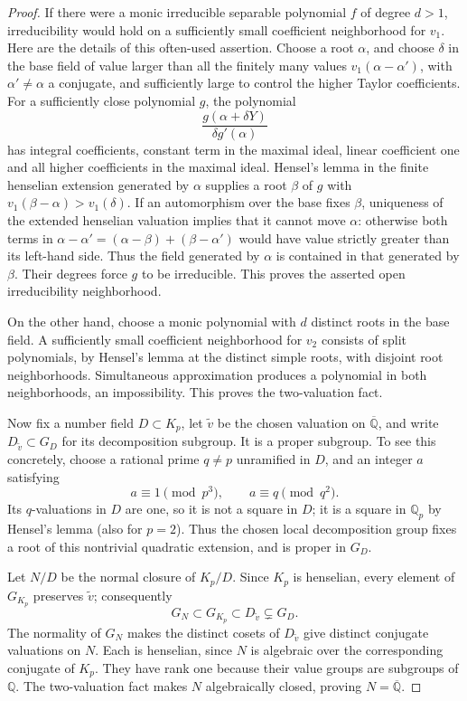 \begin{proof}
If there were a monic irreducible separable polynomial
\(f\) of degree \(d>1\), irreducibility would hold on
a sufficiently small coefficient neighborhood for \(v_1\).
Here are the details of this often-used assertion. Choose
a root \(\alpha\), and choose \(\delta\) in the base
field of value larger than all the finitely many values
\(v_1(\alpha-\alpha')\), with \(\alpha'\ne\alpha\)
a conjugate, and sufficiently large to control the higher
Taylor coefficients. For a sufficiently close polynomial
\(g\), the polynomial
\[
 \frac{g(\alpha+\delta Y)}{\delta g'(\alpha)}
\]
has integral coefficients, constant term in the maximal
ideal, linear coefficient one and all higher coefficients
in the maximal ideal. Hensel's lemma in the finite
henselian extension generated by \(\alpha\) supplies
a root \(\beta\) of \(g\) with
\(v_1(\beta-\alpha)>v_1(\delta)\).
If an automorphism over the base fixes \(\beta\),
uniqueness of the extended henselian valuation implies
that it cannot move \(\alpha\): otherwise both terms
in \(\alpha-\alpha'=(\alpha-\beta)+(\beta-\alpha')\)
would have value strictly greater than its left-hand side.
Thus the field generated by \(\alpha\) is contained
in that generated by \(\beta\). Their degrees force
\(g\) to be irreducible. This proves the asserted open
irreducibility neighborhood.

On the other hand, choose a monic polynomial with \(d\)
distinct roots in the base field. A sufficiently small
coefficient neighborhood for \(v_2\) consists of split
polynomials, by Hensel's lemma at the distinct simple
roots, with disjoint root neighborhoods. Simultaneous
approximation produces a polynomial in both neighborhoods,
an impossibility. This proves the two-valuation fact.

Now fix a number field \(D\subset K_p\), let
\(\widetilde v\) be the chosen valuation on
\(\overline{\mathbb Q}\), and write
\(D_{\widetilde v}\subset G_D\) for its decomposition
subgroup. It is a proper subgroup. To see this concretely,
choose a rational prime \(q\ne p\) unramified in
\(D\), and an integer \(a\) satisfying
\[
 a\equiv1\pmod{p^3},\qquad a\equiv q\pmod{q^2}.
\]
Its \(q\)-valuations in \(D\) are one, so it is not
a square in \(D\); it is a square in \(\mathbb Q_p\)
by Hensel's lemma (also for \(p=2\)). Thus the chosen
local decomposition group fixes a root of this nontrivial
quadratic extension, and is proper in \(G_D\).

Let \(N/D\) be the normal closure of \(K_p/D\).
Since \(K_p\) is henselian, every element of \(G_{K_p}\)
preserves \(\widetilde v\); consequently
\[
 G_N\subset G_{K_p}\subset D_{\widetilde v}
                       \subsetneq G_D.
\]
The normality of \(G_N\) makes the distinct cosets of
\(D_{\widetilde v}\) give distinct conjugate valuations
on \(N\). Each is henselian, since \(N\) is algebraic
over the corresponding conjugate of \(K_p\). They have
rank one because their value groups are subgroups of
\(\mathbb Q\). The two-valuation fact makes \(N\)
algebraically closed, proving \(N=\overline{\mathbb Q}\).


\end{proof}
